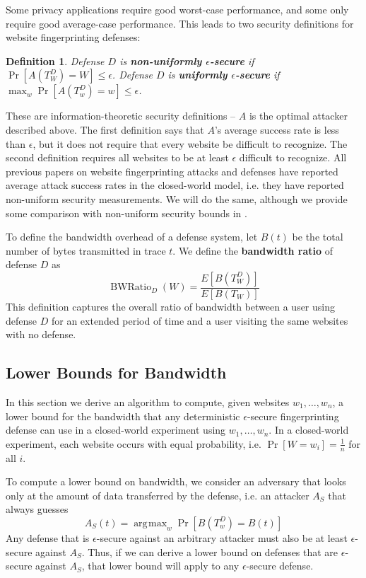 \documentclass[10pt,journal]{IEEEtran}
\newtheorem{definition}{Definition}
\DeclareMathOperator*{\argmax}{\arg\!\max}
\DeclareMathOperator{\bwratio}{BWRatio}
\begin{document}
Some privacy applications require good worst-case performance, and
some only require good average-case performance.  This leads to two
security definitions for website fingerprinting defenses:
\begin{definition}
  Defense $D$ is \textbf{non-uniformly $\epsilon$-secure} if
  $\Pr\left[A(T^D_W)=W\right]\leq\epsilon$.  Defense $D$ is
  \textbf{uniformly $\epsilon$-secure} if
  $\max_w\Pr\left[A(T^D_w)=w\right]\leq\epsilon$.
\end{definition}
These are information-theoretic security definitions -- $A$ is the
optimal attacker described above.  The first definition says that
$A$'s average success rate is less than $\epsilon$, but it does not
require that every website be difficult to recognize.  The second
definition requires all websites to be at least $\epsilon$ difficult
to recognize.  All previous papers on website fingerprinting attacks
and defenses have reported average attack success rates in the
closed-world model, i.e. they have reported non-uniform security
measurements.  We will do the same, although we provide some
comparison with non-uniform security bounds in
.

To define the bandwidth overhead of a defense system, let $B(t)$ be the
total number of bytes transmitted in trace $t$.  We define the
\textbf{bandwidth ratio} of defense $D$ as
\[
\bwratio_D(W)=\frac{E\left[B\left(T^D_W\right)\right]}{E\left[B\left(T_W\right)\right]}
\]
This definition captures the overall ratio of bandwidth between a user
using defense $D$ for an extended period of time and a user visiting
the same websites with no defense.  


\subsection{Lower Bounds for Bandwidth}\label{subsec:lower_bounds}
In this section we derive an algorithm to compute, given websites
$w_1,\dots,w_n$, a lower bound for the bandwidth that any
deterministic $\epsilon$-secure fingerprinting defense can use in
a closed-world experiment using $w_1,\dots,w_n$.  In a closed-world
experiment, each website occurs with equal probability,
i.e. $\Pr[W=w_i]=\frac{1}{n}$ for all $i$.

To compute a lower bound on bandwidth, we consider an adversary
that looks only at the amount of data transferred by the defense,
i.e. an attacker $A_S$ that always guesses
\[
A_S(t) = \argmax_w\Pr\left[B(T^D_w)=B(t)\right]
\]
Any defense that is $\epsilon$-secure against an arbitrary attacker
must also be at least $\epsilon$-secure against $A_S$.  Thus, if we
can derive a lower bound on defenses that are $\epsilon$-secure
against $A_S$, that lower bound will apply to any $\epsilon$-secure
defense.
\end{document}
